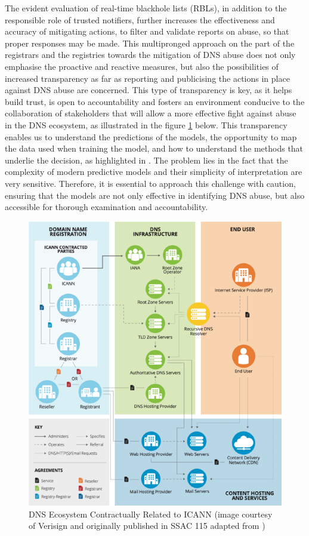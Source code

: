 The evident evaluation of real-time blackhole lists (RBLs), in addition to the responsible role of trusted notifiers, further increases the effectiveness and accuracy of mitigating actions, to filter and validate reports on abuse, so that proper responses may be made. This multipronged approach on the part of the registrars and the registries towards the mitigation of DNS abuse does not only emphasise the proactive and reactive measures, but also the possibilities of increased transparency as far as reporting and publicising the actions in place against DNS abuse are concerned. This type of transparency is key, as it helps build trust, is open to accountability and fosters an environment conducive to the collaboration of stakeholders that will allow a more effective fight against abuse in the DNS ecosystem, as illustrated in the figure \ref{fig:fig14} below. This transparency enables us to understand the predictions of the models, the opportunity to map the data used when training the model, and how to understand the methods that underlie the decision, as highlighted in \cite{hussain2022software}. The problem lies in the fact that the complexity of modern predictive models and their simplicity of interpretation are very sensitive. Therefore, it is essential to approach this challenge with caution, ensuring that the models are not only effective in identifying DNS abuse, but also accessible for thorough examination and accountability. 

\captionsetup{font= footnotesize}
\begin{figure}[H]
\centering
    \includegraphics[width=0.6\linewidth]{background/DNSECO.png}
    \caption{DNS Ecosystem Contractually Related to ICANN (image
courtesy of Verisign and originally published in SSAC 115 adapted from \cite{SSAC2023SAC115})}
    \label{fig:fig14}
\end{figure}


